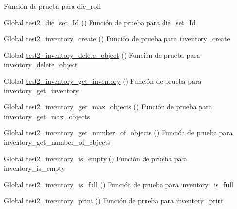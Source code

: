 \begin{DoxyRefList}
%
Función de prueba para die\+\_\+roll  
\item[Global \mbox{\hyperlink{die__test_8c_aba25cb59703baaefe0072882b847925d}{test2\+\_\+die\+\_\+set\+\_\+\+Id}} ()]\label{test__test000027}%
%
Función de prueba para die\+\_\+set\+\_\+\+Id  
\item[Global \mbox{\hyperlink{inventory__test_8c_a73a6080c360a8870c4ffc734e989c8b3}{test2\+\_\+inventory\+\_\+create}} ()]\label{test__test000037}%
%
Función de prueba para inventory\+\_\+create  
\item[Global \mbox{\hyperlink{inventory__test_8c_a7df95a4c69353ae9bf0766e3d13672f8}{test2\+\_\+inventory\+\_\+delete\+\_\+object}} ()]\label{test__test000052}%
%
Función de prueba para inventory\+\_\+delete\+\_\+object  
\item[Global \mbox{\hyperlink{inventory__test_8c_a800414ee6d964ee2424534f14a4dbda9}{test2\+\_\+inventory\+\_\+get\+\_\+inventory}} ()]\label{test__test000047}%
%
Función de prueba para inventory\+\_\+get\+\_\+inventory  
\item[Global \mbox{\hyperlink{inventory__test_8c_ac75954611acab583f780145532ab3197}{test2\+\_\+inventory\+\_\+get\+\_\+max\+\_\+objects}} ()]\label{test__test000071}%
%
Función de prueba para inventory\+\_\+get\+\_\+max\+\_\+objects  
\item[Global \mbox{\hyperlink{inventory__test_8c_afb66a921e4bd9b8df05b0c2fcbbc9649}{test2\+\_\+inventory\+\_\+get\+\_\+number\+\_\+of\+\_\+objects}} ()]\label{test__test000045}%
%
Función de prueba para inventory\+\_\+get\+\_\+number\+\_\+of\+\_\+objects  
\item[Global \mbox{\hyperlink{inventory__test_8c_a4d2a2a4d4ba59446d013debfe9bf05dc}{test2\+\_\+inventory\+\_\+is\+\_\+empty}} ()]\label{test__test000057}%
%
Función de prueba para inventory\+\_\+is\+\_\+empty  
\item[Global \mbox{\hyperlink{inventory__test_8c_a1c9e567d4919d5aaccc9580815a8a81d}{test2\+\_\+inventory\+\_\+is\+\_\+full}} ()]\label{test__test000060}%
%
Función de prueba para inventory\+\_\+is\+\_\+full  
\item[Global \mbox{\hyperlink{inventory__test_8c_ab416dcaf2ae0f9852a8c6ed5eea4f408}{test2\+\_\+inventory\+\_\+print}} ()]\label{test__test000049}%
%
Función de prueba para inventory\+\_\+print  

\end{DoxyRefList}
